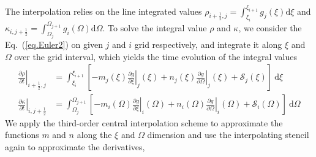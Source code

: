 
The interpolation relies on the line integrated values $\rho_{i+\frac{1}{2},j}=\int_{\xi_i}^{\xi_{i+1}}g_{j}(\xi)\mathrm{d}\xi$ and $\kappa_{i,j+\frac{1}{2}}=\int_{\Omega_j}^{\Omega_{j+1}}g_{i}(\Omega)\mathrm{d}\Omega$.
To solve the integral value $\rho$ and $\kappa$, we consider the Eq.~(\ref{eq.Euler2}) on given $j$ and $i$ grid respectively, and integrate it along $\xi$ and $\Omega$ over the grid interval, which yields the time evolution of the integral values
\begin{equation}\label{eq.line}
    \begin{aligned}
    \left.\frac{\partial \rho}{\partial t}\right|_{i+\frac{1}{2},j} &= \int_{\xi_i}^{\xi_{i+1}}[ - m_j(\xi) \left.\frac{\partial g}{\partial \xi}\right|_{j}(\xi) + n_j(\xi) \left.\frac{\partial g}{\partial \Omega}\right|_{j}(\xi) + \mathcal{S}_j(\xi)]~\mathrm{d} \xi
    \\
    \left.\frac{\partial \kappa}{\partial t}\right|_{i,j+\frac{1}{2}}
    &= \int_{\Omega_j}^{\Omega_{j+1}}[ - m_i(\Omega) \left.\frac{\partial g}{\partial \xi}\right|_{i}(\Omega) + n_i(\Omega) \left.\frac{\partial g}{\partial \Omega}\right|_{i}(\Omega) + \mathcal{S}_i(\Omega)]~\mathrm{d} \Omega
    \end{aligned}
\end{equation}
We apply the third-order central interpolation scheme to approximate the functions $m$ and $n$ along the $\xi$ and $\Omega$ dimension and use the interpolating stencil again to approximate the derivatives, 
